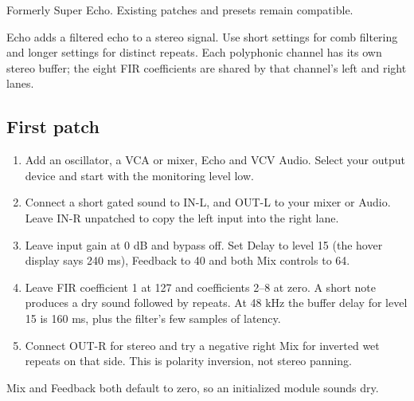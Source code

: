 Formerly Super Echo. Existing patches and presets remain compatible.

Echo adds a filtered echo to a stereo signal. Use short settings for
comb filtering and longer settings for distinct repeats. Each polyphonic
channel has its own stereo buffer; the eight FIR coefficients are shared by
that channel's left and right lanes.
\subsection{First patch}
\begin{enumerate}
\item Add an oscillator, a VCA or mixer, Echo and VCV Audio. Select your
output device and start with the monitoring level low.
\item Connect a short gated sound to IN-L, and OUT-L to your mixer or Audio.
Leave IN-R unpatched to copy the left input into the right lane.
\item Leave input gain at 0 dB and bypass off. Set Delay to level 15 (the
hover display says 240 ms), Feedback to 40 and both Mix controls to 64.
\item Leave FIR coefficient 1 at 127 and coefficients 2--8 at zero. A short
note produces a dry sound followed by repeats. At 48 kHz the buffer delay
for level 15 is 160 ms, plus the filter's few samples of latency.
\item Connect OUT-R for stereo and try a negative right Mix for inverted
wet repeats on that side. This is polarity inversion, not stereo panning.
\end{enumerate}
Mix and Feedback both default to zero, so an initialized module sounds dry.
